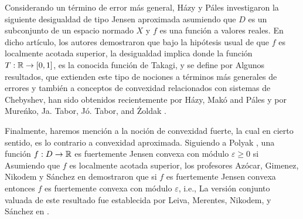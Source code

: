 Considerando un término de error más general, Házy y Páles \cite{HazPal04} investigaron la 
siguiente desigualdad de tipo Jensen aproximada
asumiendo que $D$ es un subconjunto de un espacio normado $X$ y $f$ es una función a valores reales.
En dicho artículo, los autores demostraron que bajo la hipótesis usual de que $f$ es localmente 
acotada superior, la desigualdad  implica
donde la función $T:\mathbb{R}\to[0,1]$, es la conocida función de Takagi, y se define por
Algunos resultados, que extienden este tipo de nociones a términos más generales de errores y también 
a conceptos de convexidad relacionados con sistemas de Chebyshev, han sido obtenidos recientemente
por Házy, Makó and Páles \cite{Haz05a,Haz07b,HazPal05,HazPal09,MakPal10b,MakPal12b,MakPal12c,MakPal13b}
y por Mureńko, Ja. Tabor, Jó. Tabor, and Żoldak 
\cite{MurTabTab12,TabTab09b,TabTab09a,TabTabZol10b,TabTabZol10a}.

%

Finalmente, haremos mención a la noción de convexidad fuerte, la cual en cierto sentido, es lo contrario 
a convexidad aproximada. Siguiendo a Polyak \cite{Pol66}, una función $f:D\to\mathbb{R}$ es 
fuertemente Jensen convexa con módulo $\varepsilon\geq0$ si
Asumiendo que $f$ es localmente acotada superior, los profesores Azócar, Gimenez, Nikodem y Sánchez en
 \cite{AzoGimNikSan11} demostraron que si $f$ es fuertemente Jensen convexa 
entonces $f$ es fuertemente convexa con módulo $\varepsilon$, i.e., 
La versión conjunto valuada de este resultado fue establecida por Leiva, Merentes, Nikodem, y Sánchez 
en \cite{LeiMerNikSan13}.

